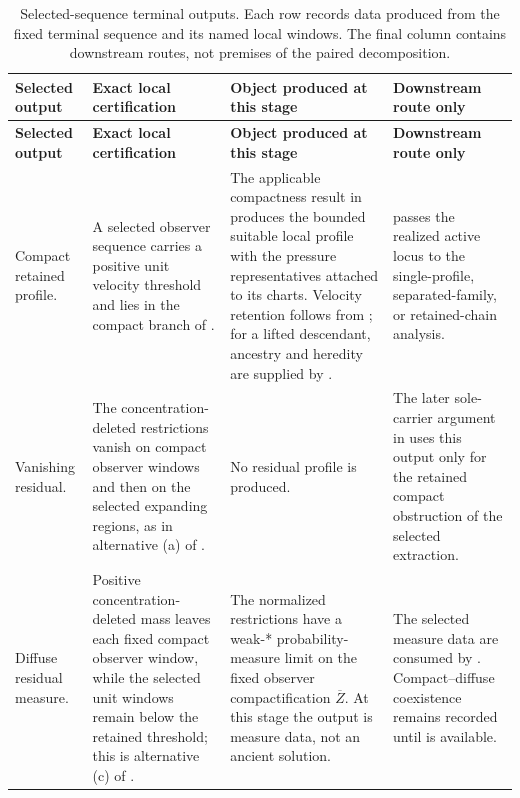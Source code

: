\documentclass[11pt]{amsart}
\numberwithin{equation}{section}
\theoremstyle{plain}
\theoremstyle{definition}
\theoremstyle{remark}
\begin{document}
\begingroup
\scriptsize
\setlength{\tabcolsep}{2pt}
\renewcommand{\arraystretch}{1.18}
\begin{longtable}{@{}L{0.16\textwidth}L{0.25\textwidth}L{0.27\textwidth}L{0.24\textwidth}@{}}
\caption{Selected-sequence terminal outputs.  Each row records data produced
from the fixed terminal sequence and its named local windows.  The final column
contains downstream routes, not premises of the paired decomposition.}
\label{tab:selected-terminal-output-directory}\\
\hline
\textbf{Selected output} & \textbf{Exact local certification} &
\textbf{Object produced at this stage} & \textbf{Downstream route only}\\
\hline
\endfirsthead
\hline
\textbf{Selected output} & \textbf{Exact local certification} &
\textbf{Object produced at this stage} & \textbf{Downstream route only}\\
\hline
\endhead
\hline
\endfoot
Compact retained profile. &
A selected observer sequence carries a positive unit velocity threshold and
lies in the compact branch of
. &
The applicable compactness result in
produces the bounded suitable local profile with the pressure
representatives attached to its charts.  Velocity retention follows from
; for a lifted descendant, ancestry and heredity
are supplied by
. &
 passes the realized active
locus to the single-profile, separated-family, or retained-chain analysis.\\

Vanishing residual. &
The concentration-deleted restrictions vanish on compact observer windows and
then on the selected expanding regions, as in alternative \textup{(a)} of
. &
No residual profile is produced. &
The later sole-carrier argument in
 uses
this output only for the retained compact obstruction of the selected
extraction.\\

Diffuse residual measure. &
Positive concentration-deleted mass leaves each fixed compact observer window,
while the selected unit windows remain below the retained threshold; this is
alternative \textup{(c)} of
. &
The normalized restrictions have a weak-* probability-measure limit on the
fixed observer compactification \(\overline Z\).  At this stage the output is
measure data, not an ancient solution. &
The selected measure data are consumed by
.
Compact--diffuse coexistence remains recorded until
 is available.\\


\end{longtable}
\end{document}
